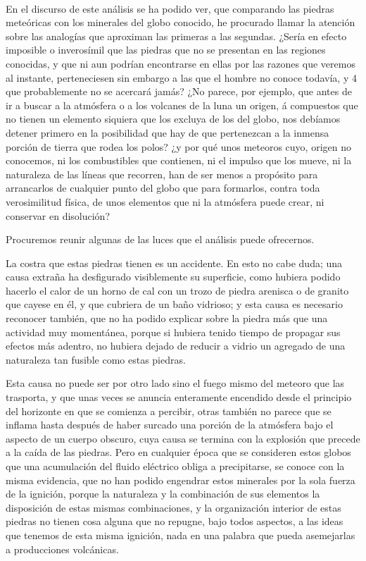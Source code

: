 \documentclass[a4paper, 12pt, oneside, spanish]{article}
\begin{document}
\paragraph{}
En el discurso de este análisis se ha podido ver, que comparando las piedras meteóricas con los minerales del globo conocido, he procurado llamar la atención sobre las analogías que aproximan las primeras a las segundas. ¿Sería en efecto imposible o inverosímil que las piedras que no se presentan en las regiones conocidas, y que ni aun podrían encontrarse en ellas por las razones que veremos al instante, perteneciesen sin embargo a las que el hombre no conoce todavía, y 4 que probablemente no se acercará jamás? ¿No parece, por ejemplo, que antes de ir a buscar a la atmósfera o a los volcanes de la luna un origen, á compuestos que no tienen un elemento siquiera que los excluya de los del globo, nos debíamos detener primero en la posibilidad que hay de que pertenezcan a la inmensa porción de tierra que rodea los polos? ¿y por qué unos meteoros cuyo, origen no conocemos, ni los combustibles que contienen, ni el impulso que los mueve, ni la naturaleza de las líneas que recorren, han de ser menos a propósito para arrancarlos de cualquier punto del globo que para formarlos, contra toda verosimilitud física, de unos elementos que ni la atmósfera puede crear, ni conservar en disolución?

Procuremos reunir algunas de las luces que el análisis puede ofrecernos.

La costra que estas piedras tienen es un accidente. En esto no cabe duda; una causa extraña ha desfigurado visiblemente su superficie, como hubiera podido hacerlo el calor de un horno de cal con un trozo de piedra arenisca o de granito que cayese en él, y que cubriera de un baño vidrioso; y esta causa es necesario reconocer también, que no ha podido explicar sobre la piedra más que una actividad muy momentánea, porque si hubiera tenido tiempo de propagar sus efectos más adentro, no hubiera dejado de reducir a vidrio un agregado de una naturaleza tan fusible como estas piedras.

Esta causa no puede ser por otro lado sino el fuego mismo del meteoro que las trasporta, y que unas veces se anuncia enteramente encendido desde el principio del horizonte en que se comienza a percibir, otras también no parece que se inflama hasta después de haber surcado una porción de la atmósfera bajo el aspecto de un cuerpo obscuro, cuya causa se termina con la explosión que precede a la caída de las piedras. Pero en cualquier época que se consideren estos globos que una acumulación del fluido eléctrico obliga a precipitarse, se conoce con la misma evidencia, que no han podido engendrar estos minerales por la sola fuerza de la ignición, porque la naturaleza y la combinación de sus elementos la disposición de estas mismas combinaciones, y la organización interior de estas piedras no tienen cosa alguna que no repugne, bajo todos aspectos, a las ideas que tenemos de esta misma ignición, nada en una palabra que pueda asemejarlas a producciones volcánicas.
\end{document}
